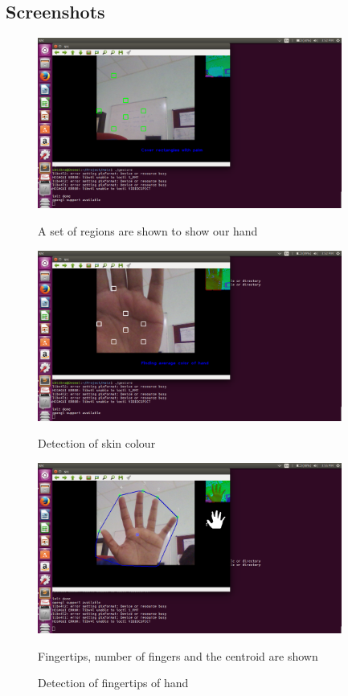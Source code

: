 \documentclass[a4paper,11pt]{article}
\begin{document}
		\subsection{Screenshots}
		\begin{figure}[!ht]
			\begin{centering}
				\includegraphics[width=10cm]{images/region.png}\\
						\caption{A set of regions are shown to show our hand}
			\end{centering}
		\end{figure}
		\begin{figure}[!ht]
			\begin{centering}
				\includegraphics[width=10cm]{images/avg.png}\\
						\caption{Detection of skin colour}
			\end{centering}
		\end{figure}
		\begin{figure}[!ht]
			\begin{centering}
				\includegraphics[width=10cm]{images/hand.png}\\
						\caption{Detection of fingertips of hand}
						Fingertips, number of fingers and the centroid are shown
			\end{centering}
		\end{figure}
		\newpage
\end{document}
